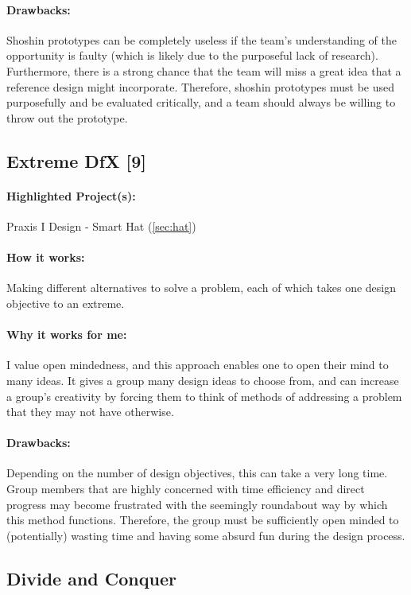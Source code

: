 \documentclass[a4paper,12pt]{article}
\begin{document}
\paragraph{Drawbacks: }
Shoshin prototypes can be completely useless if the team’s understanding of the opportunity is faulty (which is likely due to the purposeful lack of research). Furthermore, there is a strong chance that the team will miss a great idea that a reference design might incorporate. Therefore, shoshin prototypes must be used purposefully and be evaluated critically, and a team should always be willing to throw out the prototype.

\subsection{Extreme DfX [9]}
\label{sec:extreme}
\paragraph{Highlighted Project(s): } Praxis I Design - Smart Hat (\ref{sec:hat})
\paragraph{How it works: }
Making different alternatives to solve a problem, each of which takes one design objective to an extreme.

\paragraph{Why it works for me: }
I value open mindedness, and this approach enables one to open their mind to many ideas. It gives a group many design ideas to choose from, and can increase a group’s creativity by forcing them to think of methods of addressing a problem that they may not have otherwise.

\paragraph{Drawbacks: }
Depending on the number of design objectives, this can take a very long time. Group members that are highly concerned with time efficiency and direct progress may become frustrated with the seemingly roundabout way by which this method functions. Therefore, the group must be sufficiently open minded to (potentially) wasting time and having some absurd fun during the design process.

\subsection{Divide and Conquer}
\label{sec:conquer}
\end{document}
